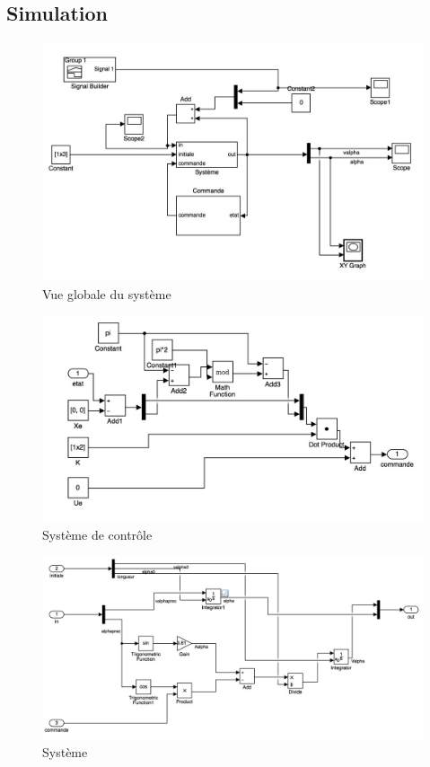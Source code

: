 \documentclass[11pt]{article}
\begin{document}
\subsection{Simulation}
\begin{figure}[h!]
	\includegraphics[scale=0.2]{images/pendule_inverse_1}
	\caption{Vue globale du système}
\end{figure}
\begin{figure}[h!]
	\includegraphics[scale=0.2]{images/pendule_inverse_2}
	\caption{Système de contrôle}
\end{figure}
\begin{figure}[h!]
	\includegraphics[scale=0.2]{images/pendule_inverse_3}
	\caption{Système}
\end{figure}
\end{document}
